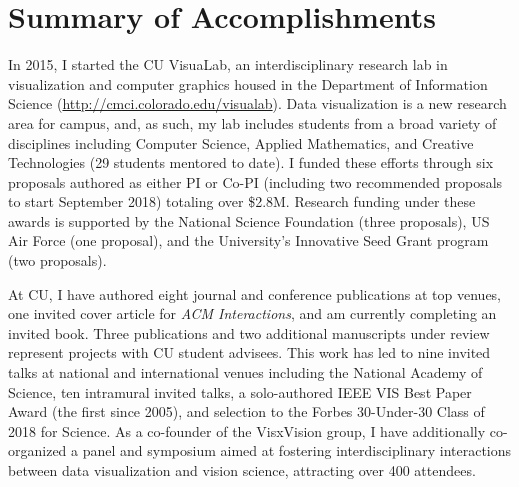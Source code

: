 \documentclass[11pt]{article}
\begin{document}

\section*{Summary of Accomplishments}

In 2015, I started the CU VisuaLab, an interdisciplinary research lab in visualization and computer graphics housed in the Department of Information Science (\href{http://cmci.colorado.edu/visualab}{http://cmci.colorado.edu/visualab}). Data visualization is a new research area for campus, and, as such, my lab includes students from a broad variety of disciplines including Computer Science, Applied Mathematics, and Creative Technologies (29 students mentored to date). I funded these efforts through six proposals authored as either PI or Co-PI (including two recommended proposals to start September 2018) totaling over \$2.8M. Research funding under these awards is supported by the National Science Foundation (three proposals), US Air Force (one proposal), and the University's Innovative Seed Grant program (two proposals).


At CU, I have authored eight journal and conference publications at top venues, one invited cover article for \emph{ACM Interactions}, and am currently completing an invited book. Three publications and two additional manuscripts under review represent projects with CU student advisees. This work has led to nine invited talks at national and international venues including the National Academy of Science, ten intramural invited talks, a solo-authored IEEE VIS Best Paper Award (the first since 2005), and selection to the Forbes 30-Under-30 Class of 2018 for Science.  As a co-founder of the VisxVision group, I have additionally co-organized a panel and symposium aimed at fostering interdisciplinary interactions between data visualization and vision science, attracting over 400 attendees. 
\end{document}
